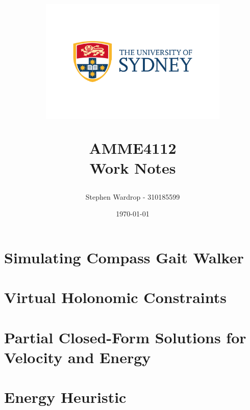 \documentclass[12pt,a4paper,oneside]{article}
\title{\begin{figure}[!htb]
\centering
\includegraphics[width = 0.8\textwidth]{../Images/usyd.jpg}
\end{figure}
\textsc{AMME4112}\\{Work Notes}}
\author{Stephen Wardrop - 310185599}
\date{\today}
\begin{document}
\maketitle
\thispagestyle{empty}
\pagebreak

\tableofcontents
\pagebreak
\fancyhf{}
\fancyhead[L]{}
\fancyfoot[C]{\thepage}
\pagestyle{fancy}


\section{Simulating Compass Gait Walker}\setcounter{figure}{0}\setcounter{equation}{0}\setcounter{table}{0}

\pagebreak

\section{Virtual Holonomic Constraints}\setcounter{figure}{0}\setcounter{equation}{0}\setcounter{table}{0}

\pagebreak

\section{Partial Closed-Form Solutions for Velocity and Energy}
\setcounter{figure}{0}\setcounter{equation}{0}\setcounter{table}{0}

\pagebreak

\section{Energy Heuristic}
\setcounter{figure}{0}\setcounter{equation}{0}\setcounter{table}{0}


\pagebreak

\end{document}
